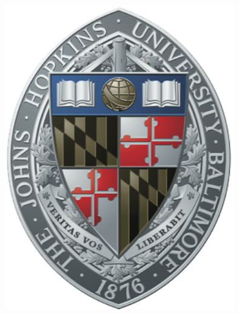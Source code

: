 \documentclass[a0,landscape]{a0poster}
\begin{document}
\begin{minipage}[b]{0.19\linewidth}
  \begin{flushright}
    \includegraphics[width=10cm]{jhu_seal.png}
  \end{flushright}
\end{minipage}


\vspace{1cm} %

\end{document}
